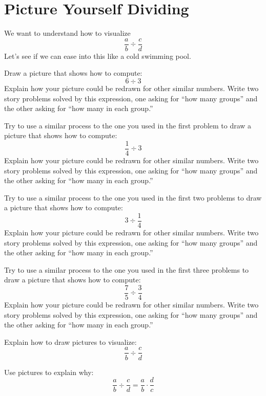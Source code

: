\newpage
\section{Picture Yourself Dividing}


We want to understand how to visualize 
\[
\frac{a}{b} \div \frac{c}{d}
\]
Let's see if we can ease into this like a cold swimming pool.

\begin{prob}
Draw a picture that shows how to compute:
\[
6\div 3
\]
Explain how your picture could be redrawn for other similar
numbers. Write two story problems solved by this expression, one
asking for ``how many groups'' and the other asking for ``how many in
each group.''
\end{prob}

\begin{prob}
Try to use a similar process to the one you used in the first problem
to draw a picture that shows how to compute:
\[
\frac{1}{4} \div 3
\]
Explain how your picture could be redrawn for other similar numbers.
Write two story problems solved by this expression, one asking for
``how many groups'' and the other asking for ``how many in each
group.''
\end{prob}


\begin{prob}
Try to use a similar process to the one you used in the first two problems
to draw a picture that shows how to compute:
\[
3 \div \frac{1}{4}
\]
Explain how your picture could be redrawn for other similar numbers.
Write two story problems solved by this expression, one asking for
``how many groups'' and the other asking for ``how many in each
group.''
\end{prob}

\begin{prob}
Try to use a similar process to the one you used in the first three problems
to draw a picture that shows how to compute:
\[
\frac{7}{5} \div \frac{3}{4}
\]
Explain how your picture could be redrawn for other similar numbers.
Write two story problems solved by this expression, one asking for
``how many groups'' and the other asking for ``how many in each
group.''
\end{prob}

\begin{prob}
Explain how to draw pictures to visualize:
\[
\frac{a}{b} \div \frac{c}{d}
\]
\end{prob}

\begin{prob}
Use pictures to explain why:
\[
\frac{a}{b} \div \frac{c}{d} = \frac{a}{b} \cdot \frac{d}{c}
\]
\end{prob}
